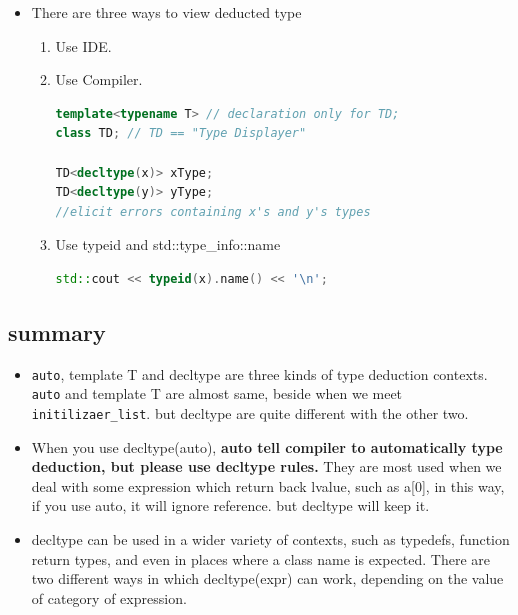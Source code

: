 \documentclass[a4paper,11pt,twoside]{book}
\begin{document}
\begin{itemize}
	\item There are three ways to view deducted type
	\begin{enumerate}
		\item Use IDE.
		\item Use Compiler.
\begin{lstlisting}[frame=single, language=c++]
template<typename T> // declaration only for TD;
class TD; // TD == "Type Displayer"

TD<decltype(x)> xType; 
TD<decltype(y)> yType; 
//elicit errors containing x's and y's types
\end{lstlisting}

	\item Use typeid and std::type\_info::name
	
\begin{lstlisting}[frame=single, language=c++]
std::cout << typeid(x).name() << '\n'; 
\end{lstlisting}
		
	\end{enumerate}
	
\end{itemize}

\subsection{summary}
\begin{itemize}
	\item \texttt{auto}, template T and decltype are three kinds of type deduction contexts. \texttt{auto} and template T are almost same, beside when we meet \texttt{initilizaer\_list}. but decltype are quite different with the other two. 
	
	\item When you use decltype(auto), \textbf{auto tell compiler to automatically type deduction, but please use decltype rules.} They are most used when we deal with some expression which return back lvalue, such as a[0], in this way, if you use auto, it will ignore reference. but decltype will keep it. 
	
	\item decltype can be used in a wider variety of contexts, such as typedefs, function return types, and even in places where a class name is expected. There are two different ways in which decltype(expr) can work, depending on the value of category of expression.

\end{itemize}
\end{document}
